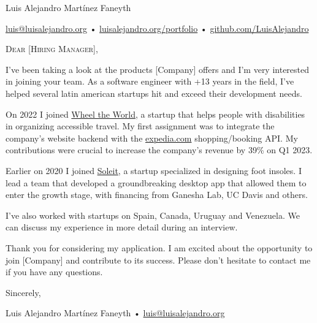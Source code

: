 \documentclass[12pt]{article}
\begin{document}
  \centering
  \begin{cv}{Luis Alejandro Mart\'inez Faneyth}
    
    \vspace{0.25em}
    \href{mailto:luis@luisalejandro.org}{luis@luisalejandro.org} •
    \href{https://luisalejandro.org/portfolio}{luisalejandro.org/portfolio} •
    \href{https://github.com/LuisAlejandro}{github.com/LuisAlejandro}
    \vspace{0.125em}

    \hrulefill

    \begin{minipage}[t]{0.75\textwidth}
      \vspace{4em}

      \textrm{\textsc{\Large{Dear [Hiring Manager],}}}
      \vspace{2em}
      \newline
      \parbox[t]{\linewidth}{
        \linespread{1.5}\selectfont
          I've been taking a look at the products [Company] offers and I'm very interested in joining your team. As a software engineer with +13 years in the field, I've helped several latin american startups hit and exceed their development needs.
          \newline

          On 2022 I joined \href{https://wheeltheworld.com}{Wheel the World}, a startup that helps people with disabilities in organizing accessible travel. My first assignment was to integrate the company's website backend with the \href{https://expedia.com}{expedia.com} shopping/booking API. My contributions were crucial to increase the company's revenue by 39\% on Q1 2023.
          \newline

          Earlier on 2020 I joined \href{https://soleit.app/es/inicio}{Soleit}, a startup specialized in designing foot insoles. I lead a team that developed a groundbreaking desktop app that allowed them to enter the growth stage, with financing from Ganesha Lab, UC Davis and others.
          \newline

          I've also worked with startups on Spain, Canada, Uruguay and Venezuela. We can discuss my experience in more detail during an interview.
          \newline

          Thank you for considering my application. I am excited about the opportunity to join [Company] and contribute to its success. Please don't hesitate to contact me if you have any questions.
          \newline

          Sincerely,
      }
      \vspace{0.125em}
      \parbox[t]{\linewidth}{
        \centering
        \vspace{4em}
        Luis Alejandro Mart\'inez Faneyth • \href{mailto:luis@luisalejandro.org}{luis@luisalejandro.org}
      }
    \end{minipage}

  \end{cv}
\end{document}
